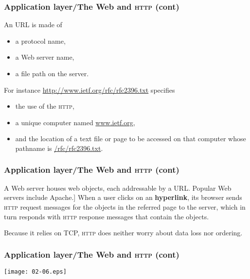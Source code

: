 %
\begin{frame}
\frametitle{Application layer/The Web and \textsc{http} (cont)}

An URL is made of 
\begin{itemize}

  \item a protocol name,

  \item a Web server name,

  \item a file path on the server.

\end{itemize}

For instance \url{http://www.ietf.org/rfc/rfc2396.txt} specifies 
\begin{itemize}

  \item the use of the \textsc{http}, 

  \item a unique computer named \url{www.ietf.org},

  \item and the location of a text file or page to be accessed on that
  computer whose pathname is \url{/rfc/rfc2396.txt}.

\end{itemize}

\end{frame}

%
\begin{frame}
\frametitle{Application layer/The Web and \textsc{http} (cont)}

A Web server houses web objects, each addressable by a URL. Popular
Web servers include Apache.]  When a user clicks on an
  \textbf{hyperlink}, its browser sends \textsc{http} request messages
  for the objects in the referred page to the server, which in turn
  responds with \textsc{http} response messages that contain the
  objects.

\bigskip

Because it relies on TCP, \textsc{http} does neither worry about data
loss nor ordering.

\end{frame}

%
\begin{frame}
\frametitle{Application layer/The Web and \textsc{http} (cont)}

\begin{center}
  \texttt{[image: 02-06.eps]}
\end{center}

\end{frame}

